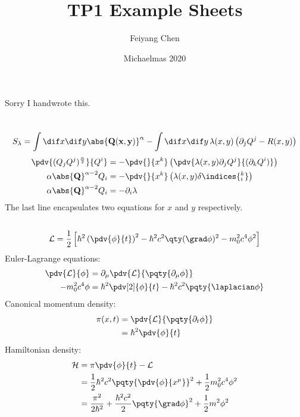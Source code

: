\documentclass[12pt]{article}
\begin{document}
\title{TP1 Example Sheets}
\author{Feiyang Chen}
\date{Michaelmas 2020}
\maketitle
\thispagestyle{empty}
\tableofcontents
\newpage
\section{}
Sorry I handwrote this.
\newpage
\section{}
\subsection{} { \[ S_\lambda = \int \dif x \dif y\abs{\bf Q(x,y)}^\alpha - \int \dif x \dif y\,  \lambda(x,y)\left(\partial_j Q^j - R(x,y)\right)\]}
        \begin{align*}
            \pdv{(Q_jQ^j)^\frac{\alpha}{2}}{Q^i} &=  - \pdv{}{x^k}\left(\pdv{\lambda(x,y)\partial_jQ^j}{(\partial_kQ^i)}\right)\\
            \alpha\abs{\bf Q}^{\alpha - 2}Q_i &=  - \pdv{}{x^k}\left(\lambda(x,y)\delta\indices{^k_i}\right)\\
            \alpha\abs{\bf Q}^{\alpha - 2}Q_i &=  - \partial_i{\lambda} 
        \end{align*}
        The last line encapsulates two equations for $x$ and $y$ respectively.
        \subsection{} { \[
            \mathcal L = \frac{1}{2}\left[ \hbar^2 \left(\pdv{\phi}{t}\right)^2 - \hbar^2 c^2 \qty(\grad \phi)^2 - m_0^2c^ 4\phi^2\right]
        \]}
        Euler-Lagrange equations:
        \begin{align*}
            \pdv{ \mathcal{L}}{\phi } &=  \partial_\mu \pdv{ \mathcal{L}}{\pqty{\partial_\mu \phi }} \\
            -m_0^2c^4  \phi &= \hbar^2 \pdv[2]{\phi }{t} - \hbar^2c^2 \pqty{\laplacian \phi }
        \end{align*}
        Canonical momentum density:
        \begin{align*}
            \pi(x,t) &= \pdv{ \mathcal{L}}{ \pqty{\partial_t \phi }}\\
            &= \hbar^2 \pdv{\phi }{t}
        \end{align*}
        Hamiltonian density:
        \begin{align*}
            \mathcal{H} &=  \pi \pdv{\phi }{t} - \mathcal{L}\\
            &= \frac{1}{2}\hbar^2c^2 \pqty{\pdv{\phi }{x^\mu }}^2 + \frac{1}{2}m_0^2c^4 \phi^2\\
            &= \frac{\pi^2}{ 2\hbar^2} + \frac{ \hbar^2 c^2}{2} \pqty{\grad \phi }^2 + \frac{1}{2}m^2\phi^2
        \end{align*}
\end{document}
